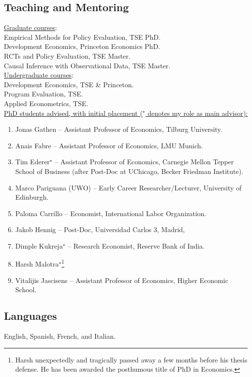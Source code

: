 \documentclass[12pt,english]{article}
\newcommand\reverselabel[1]{%
  \def\theenumi{}%
  \renewcommand\makelabel{\makebox[\dimexpr\labelwidth-3pt\relax][r]{%
    \the\numexpr#1-\value{enumi}+1\relax}}}%
\begin{document}
\subsection*{Teaching and Mentoring}
\underline{Graduate courses}: \\
Empirical Methods for Policy Evaluation, TSE PhD.\vspace{0.2cm} \\
Development Economics, Princeton Economics PhD.\vspace{0.2cm} \\
RCTs and Policy Evaluation, TSE Master. \vspace{0.2cm} \\
Causal Inference with Observational Data, TSE Master. \\

\noindent \underline{Undergraduate courses}: \\
Development Economics, TSE \& Princeton. \vspace{0.2cm}\\
Program Evaluation, TSE. \vspace{0.2cm}\\
Applied Econometrics, TSE. \\

\noindent \underline{PhD students advised, with initial placement ($^\star$ denotes my role as main advisor):} 
\begin{enumerate}\reverselabel{9}
\item Jonas Gathen -- Assistant Professor of Economics, Tilburg University.
\item Anais Fabre -- Assistant Professor of Economics, LMU Munich.
\item Tim Ederer$^\star$ -- Assistant Professor of Economics, Carnegie Mellon Tepper School of Business (after Post-Doc at UChicago, Becker Friedman Institute).
\item Marco Pariguana (UWO) -- Early Career Researcher/Lecturer, University of Edinburgh.
\item Paloma Carrillo -- Economist, International Labor Organization.
\item Jakob Hennig -- Post-Doc, Universidad Carlos 3, Madrid,
\item Dimple Kukreja$^\star$ --  Research Economist, Reserve Bank of India.
\item Harsh Malotra$^\star$\footnote{Harsh unexpectedly and tragically passed away a few months before his thesis defense. He has been awarded the posthumous title of PhD in Economics.} 
\item Vitalijis Jascisens -- Assistant Professor of Economics, Higher Economic School.
\end{enumerate}

\subsection*{Languages}
English, Spanish, French, and Italian.
\end{document}
